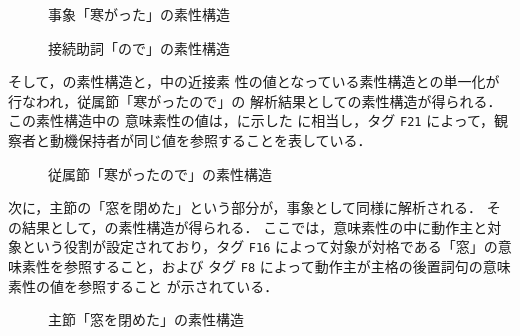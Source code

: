 \begin{figure}[htbp]

\begin{center}
  
\end{center}


\caption{事象「寒がった」の素性構造}
\end{figure}

\begin{figure}[htbp]

\begin{center}
  
\end{center}


\caption{接続助詞「ので」の素性構造}
\end{figure}

そして，の素性構造と，中の近接素
性の値となっている素性構造との単一化が行なわれ，従属節「寒がったので」の
解析結果としての素性構造が得られる．この素性構造中の
意味素性の値は，に示した  に相当し，タグ 
{\tt F21} によって，観察者と動機保持者が同じ値を参照することを表している．

\begin{figure}[htbp]

\begin{center}
  
\end{center}


\caption{従属節「寒がったので」の素性構造}
\end{figure}



次に，主節の「窓を閉めた」という部分が，事象として同様に解析される．
その結果として，の素性構造が得られる．
ここでは，意味素性の中に動作主と対象という役割が設定されており，タグ 
{\tt F16} によって対象が対格である「窓」の意味素性を参照すること，および
タグ {\tt F8} によって動作主が主格の後置詞句の意味素性の値を参照すること
が示されている．

\begin{figure}[htbp]

\begin{center}
  
\end{center}


\caption{主節「窓を閉めた」の素性構造}
\end{figure}

